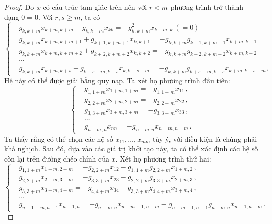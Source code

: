 \begin{proof}
Do $x$ có cấu trúc tam giác trên nên với $r < m$ phương trình trở thành dạng $0 = 0$. Với $r,s\geq m$, ta có
\begin{equation*}
\left\{
\begin{aligned}
    &g_{k,k+m} x_{k+m,k+m} + g_{k,k+m} x_{kk} = - g_{k,k+m}^2 x_{k+m,k} \ (= 0) \\
    &g_{k,k+m} x_{k+m,k+m+1} + g_{k+1,k+m+1} x_{k,k+1} = - g_{k,k+m} g_{k+1,k+m+1} x_{k+m,k+1} \\
    &g_{k,k+m} x_{k+m,k+m+2} + g_{k+2,k+m+2} x_{k,k+2} = - g_{k,k+m} g_{k+2,k+m+2} x_{k+m,k+2} \\
    &\cdots \\
    &g_{k,k+m} x_{k+m,k+s} + g_{k+s-m,k+s} x_{k,k+s-m} = - g_{k,k+m} g_{k+s-m,k+s} x_{k+m,k+s-m},
\end{aligned}
\right.
\end{equation*}
Hệ này có thể được giải bằng quy nạp. Ta xét họ phương trình đầu tiên:
\begin{equation*}
\left\{
\begin{aligned}
    &g_{1, 1+m} x_{1+m, 1+m} = - g_{1, 1+m} x_{11}\,, \\
    &g_{2, 2+m} x_{2+m, 2+m} = - g_{2, 2+m} x_{22}\,, \\
    &g_{3, 3+m} x_{3+m, 3+m} = - g_{3, 3+m} x_{33}\,, \\
    &\cdots \\
    &g_{n-m, n} x_{nn} = - g_{n-m, n} x_{n-m, n-m}\,.
\end{aligned}
\right.
\end{equation*}
Ta thấy rằng có thể chọn các hệ số $x_{11}, \dots, x_{mm}$ tùy ý, với điều kiện là chúng phải khả nghịch. Sau đó, dựa vào các giá trị khởi tạo này, ta có thể xác định các hệ số còn lại trên đường chéo chính của $x$. Xét họ phương trình thứ hai:
\begin{equation*}
\left\{
\begin{aligned}
    &g_{1,1+m} x_{1+m,2+m} = - g_{2,2+m} x_{12} - g_{1,1+m} g_{2,2+m} x_{1+m,2}\,, \\
    &g_{2,2+m} x_{2+m,3+m} = -g_{3,3+m} x_{23} - g_{2,2+m} g_{3,3+m} x_{2+m,3}\,, \\
    &g_{3,3+m} x_{3+m,4+m} = -g_{4,4+m} x_{34} - g_{3,3+m} g_{4,4+m} x_{3+m,4}\,, \\
    &\cdots \\
    &g_{n-1-m,n-1} x_{n-1,n} = - g_{n-m,n} x_{n-m-1,n-m} - g_{n-m-1,n-1} g_{n-m,n} x_{n-1,n-m}\,.
\end{aligned}
\right.
\end{equation*}

\end{proof}
